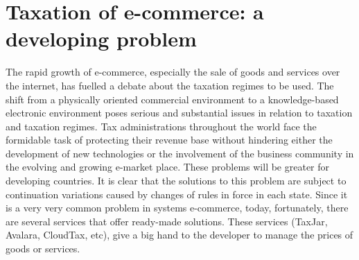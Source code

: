 \section{Taxation of e-commerce: a developing problem}
\label{sec:taxation_overview}
The rapid growth of e-commerce, especially the sale of goods and services over the internet, has fuelled a debate about the taxation regimes to be used.
\newline
The shift from a physically oriented commercial environment to a knowledge-based electronic environment poses serious and substantial issues in relation to taxation and taxation regimes. Tax administrations throughout the world face the formidable task of protecting their revenue base without hindering either the development of new technologies or the involvement of the business community in the evolving and growing e-market place.
These problems will be greater for developing countries.
\newline
It is clear that the solutions to this problem are subject to continuation variations caused by changes of rules in force in each state.
\newline
Since it is a very very common problem in systems e-commerce, today, fortunately, there are several services that offer ready-made solutions.
\newline
These services (TaxJar, Avalara, CloudTax, etc), give a big hand to the developer to manage the prices of goods or services.
